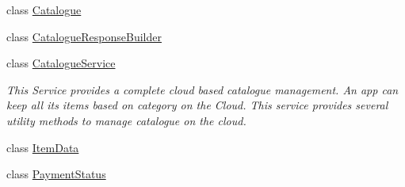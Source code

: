 \begin{DoxyCompactItemize}
class \hyperlink{classcom_1_1shephertz_1_1app42_1_1paas_1_1sdk_1_1csharp_1_1shopping_1_1_catalogue}{Catalogue}
\item 
class \hyperlink{classcom_1_1shephertz_1_1app42_1_1paas_1_1sdk_1_1csharp_1_1shopping_1_1_catalogue_response_builder}{Catalogue\+Response\+Builder}
\item 
class \hyperlink{classcom_1_1shephertz_1_1app42_1_1paas_1_1sdk_1_1csharp_1_1shopping_1_1_catalogue_service}{Catalogue\+Service}
\begin{DoxyCompactList}\small\item\em This Service provides a complete cloud based catalogue management. An app can keep all its items based on category on the Cloud. This service provides several utility methods to manage catalogue on the cloud. \end{DoxyCompactList}\item 
class \hyperlink{classcom_1_1shephertz_1_1app42_1_1paas_1_1sdk_1_1csharp_1_1shopping_1_1_item_data}{Item\+Data}
\item 
class \hyperlink{classcom_1_1shephertz_1_1app42_1_1paas_1_1sdk_1_1csharp_1_1shopping_1_1_payment_status}{Payment\+Status}
\end{DoxyCompactItemize}
